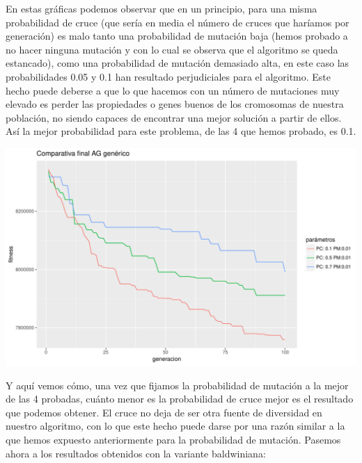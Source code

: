 \documentclass[10pt,a4paper]{article}
\begin{document}
En estas gráficas podemos observar que en un principio, para una misma probabilidad de cruce (que sería en media el número de cruces que haríamos por generación) es malo tanto una probabilidad de mutación baja (hemos probado a no hacer ninguna mutación y con lo cual se observa que el algoritmo se queda estancado), como una probabilidad de mutación demasiado alta, en este caso las probabilidades 0.05 y 0.1 han resultado perjudiciales para el algoritmo. Este hecho puede deberse a que lo que hacemos con un número de mutaciones muy elevado es perder las propiedades o genes buenos de los cromosomas de nuestra población, no siendo capaces de encontrar una mejor solución a partir de ellos. Así la mejor probabilidad para este problema, de las 4 que hemos probado, es 0.1.

\includegraphics[width = \textwidth]{img/graphics/GAgenericFinal.pdf}

Y aquí vemos cómo, una vez que fijamos la probabilidad de mutación a la mejor de las 4 probadas, cuánto menor es la probabilidad de cruce mejor es el resultado que podemos obtener. El cruce no deja de ser otra fuente de diversidad en nuestro algoritmo, con lo que este hecho puede darse por una razón similar a la que hemos expuesto anteriormente para la probabilidad de mutación. Pasemos ahora a los resultados obtenidos con la variante baldwiniana:\\
\end{document}
